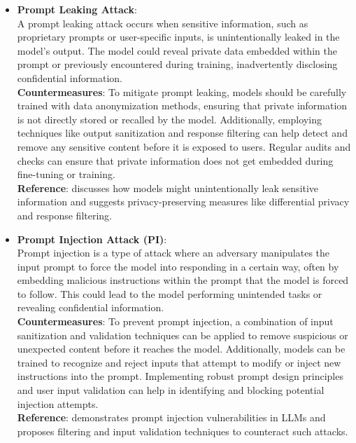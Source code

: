 \documentclass[12pt]{article}
\begin{document}
\begin{itemize}
        \item \textbf{Prompt Leaking Attack}: \\
        A prompt leaking attack occurs when sensitive information, such as proprietary prompts or user-specific inputs, is unintentionally leaked in the model’s output. The model could reveal private data embedded within the prompt or previously encountered during training, inadvertently disclosing confidential information. \\
        \textbf{Countermeasures}: To mitigate prompt leaking, models should be carefully trained with data anonymization methods, ensuring that private information is not directly stored or recalled by the model. Additionally, employing techniques like output sanitization and response filtering can help detect and remove any sensitive content before it is exposed to users. Regular audits and checks can ensure that private information does not get embedded during fine-tuning or training. \\
        \textbf{Reference}: \cite{Carlini_2021} discusses how models might unintentionally leak sensitive information and suggests privacy-preserving measures like differential privacy and response filtering.

        \item \textbf{Prompt Injection Attack (PI)}: \\
        Prompt injection is a type of attack where an adversary manipulates the input prompt to force the model into responding in a certain way, often by embedding malicious instructions within the prompt that the model is forced to follow. This could lead to the model performing unintended tasks or revealing confidential information. \\
        \textbf{Countermeasures}: To prevent prompt injection, a combination of input sanitization and validation techniques can be applied to remove suspicious or unexpected content before it reaches the model. Additionally, models can be trained to recognize and reject inputs that attempt to modify or inject new instructions into the prompt. Implementing robust prompt design principles and user input validation can help in identifying and blocking potential injection attempts. \\
        \textbf{Reference}: \cite{Wallace_2021} demonstrates prompt injection vulnerabilities in LLMs and proposes filtering and input validation techniques to counteract such attacks.


\end{itemize}
\end{document}

